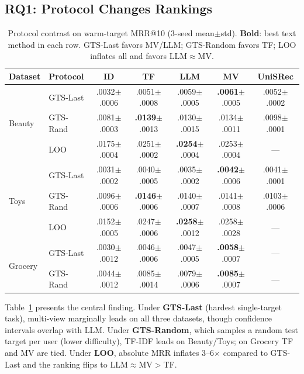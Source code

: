 \documentclass[sigconf,natbib=true,anonymous]{acmart}
\newcommand{\tfidf}{\textsc{TF-IDF}\xspace}
\begin{document}
\subsection{RQ1: Protocol Changes Rankings}
\label{sec:rq1}

\begin{table}[t]
\centering
\caption{%
Protocol contrast on warm-target MRR@10 (3-seed mean$\pm$std).
\textbf{Bold}: best text method in each row.
GTS-Last favors MV/LLM; GTS-Random favors TF; LOO inflates all and favors LLM$\approx$MV.%
}
\label{tab:protocol}
\small
\setlength{\tabcolsep}{3pt}
\begin{tabular}{@{}llccccc@{}}
\toprule
Dataset & Protocol & ID & TF & LLM & MV & UniSRec \\
\midrule
\multirow{3}{*}{Beauty}
 & GTS-Last  & .0032\tiny{$\pm$.0006} & .0051\tiny{$\pm$.0008} & .0059\tiny{$\pm$.0005} & \textbf{.0061}\tiny{$\pm$.0005} & .0052\tiny{$\pm$.0002} \\
 & GTS-Rand  & .0081\tiny{$\pm$.0003} & \textbf{.0139}\tiny{$\pm$.0013} & .0130\tiny{$\pm$.0015} & .0134\tiny{$\pm$.0011} & .0098\tiny{$\pm$.0001} \\
 & LOO       & .0175\tiny{$\pm$.0004} & .0251\tiny{$\pm$.0002} & \textbf{.0254}\tiny{$\pm$.0004} & .0253\tiny{$\pm$.0004} & --- \\
\midrule
\multirow{3}{*}{Toys}
 & GTS-Last  & .0031\tiny{$\pm$.0002} & .0040\tiny{$\pm$.0005} & .0035\tiny{$\pm$.0002} & \textbf{.0042}\tiny{$\pm$.0006} & .0041\tiny{$\pm$.0001} \\
 & GTS-Rand  & .0096\tiny{$\pm$.0006} & \textbf{.0146}\tiny{$\pm$.0006} & .0140\tiny{$\pm$.0007} & .0141\tiny{$\pm$.0008} & .0103\tiny{$\pm$.0006} \\
 & LOO       & .0152\tiny{$\pm$.0005} & .0247\tiny{$\pm$.0006} & \textbf{.0258}\tiny{$\pm$.0012} & .0258\tiny{$\pm$.0028} & --- \\
\midrule
\multirow{2}{*}{Grocery}
 & GTS-Last  & .0030\tiny{$\pm$.0012} & .0046\tiny{$\pm$.0006} & .0047\tiny{$\pm$.0005} & \textbf{.0058}\tiny{$\pm$.0007} & --- \\
 & GTS-Rand  & .0044\tiny{$\pm$.0012} & .0085\tiny{$\pm$.0014} & .0079\tiny{$\pm$.0006} & \textbf{.0085}\tiny{$\pm$.0007} & --- \\
\bottomrule
\end{tabular}
\end{table}

Table~\ref{tab:protocol} presents the central finding.
Under \textbf{GTS-Last} (hardest single-target task), multi-view marginally leads on all three datasets, though confidence intervals overlap with LLM.
Under \textbf{GTS-Random}, which samples a random test target per user (lower difficulty), \tfidf leads on Beauty/Toys; on Grocery TF and MV are tied.
Under \textbf{LOO}, absolute MRR inflates 3--6$\times$ compared to GTS-Last and the ranking flips to LLM$\approx$MV$>$TF.
\end{document}

